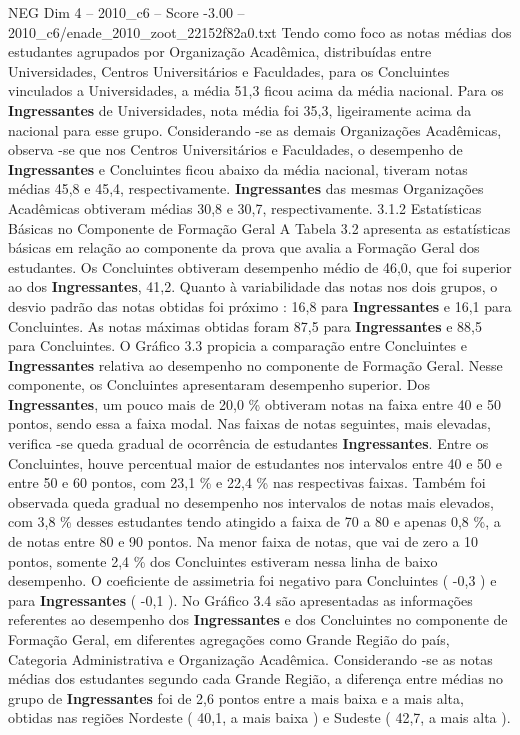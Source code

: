 \begin{textsample}{NEG Dim 4 – 2010\_c6 – Score -3.00 – 2010\_c6/enade\_2010\_zoot\_22152f82a0.txt}
Tendo como foco as notas médias dos estudantes agrupados por Organização Acadêmica, distribuídas entre Universidades, Centros Universitários e Faculdades, para os Concluintes vinculados a Universidades, a média 51,3 ficou acima da média nacional.
Para os \textbf{Ingressantes} de Universidades, nota média foi 35,3, ligeiramente acima da nacional para esse grupo.
Considerando -se as demais Organizações Acadêmicas, observa -se que nos Centros Universitários e Faculdades, o desempenho de \textbf{Ingressantes} e Concluintes ficou abaixo da média nacional, tiveram notas médias 45,8 e 45,4, respectivamente. \textbf{Ingressantes} das mesmas Organizações Acadêmicas obtiveram médias 30,8 e 30,7, respectivamente. 3.1.2 Estatísticas Básicas no Componente de Formação Geral A Tabela 3.2 apresenta as estatísticas básicas em relação ao componente da prova que avalia a Formação Geral dos estudantes.
Os Concluintes obtiveram desempenho médio de 46,0, que foi superior ao dos \textbf{Ingressantes}, 41,2.
Quanto à variabilidade das notas nos dois grupos, o desvio padrão das notas obtidas foi próximo : 16,8 para \textbf{Ingressantes} e 16,1 para Concluintes.
As notas máximas obtidas foram 87,5 para \textbf{Ingressantes} e 88,5 para Concluintes.
O Gráfico 3.3 propicia a comparação entre Concluintes e \textbf{Ingressantes} relativa ao desempenho no componente de Formação Geral.
Nesse componente, os Concluintes apresentaram desempenho superior.
Dos \textbf{Ingressantes}, um pouco mais de 20,0 \% obtiveram notas na faixa entre 40 e 50 pontos, sendo essa a faixa modal.
Nas faixas de notas seguintes, mais elevadas, verifica -se queda gradual de ocorrência de estudantes \textbf{Ingressantes}.
Entre os Concluintes, houve percentual maior de estudantes nos intervalos entre 40 e 50 e entre 50 e 60 pontos, com 23,1 \% e 22,4 \% nas respectivas faixas.
Também foi observada queda gradual no desempenho nos intervalos de notas mais elevados, com 3,8 \% desses estudantes tendo atingido a faixa de 70 a 80 e apenas 0,8 \%, a de notas entre 80 e 90 pontos.
Na menor faixa de notas, que vai de zero a 10 pontos, somente 2,4 \% dos Concluintes estiveram nessa linha de baixo desempenho.
O coeficiente de assimetria foi negativo para Concluintes ( -0,3 ) e para \textbf{Ingressantes} ( -0,1 ).
No Gráfico 3.4 são apresentadas as informações referentes ao desempenho dos \textbf{Ingressantes} e dos Concluintes no componente de Formação Geral, em diferentes agregações como Grande Região do país, Categoria Administrativa e Organização Acadêmica.
Considerando -se as notas médias dos estudantes segundo cada Grande Região, a diferença entre médias no grupo de \textbf{Ingressantes} foi de 2,6 pontos entre a mais baixa e a mais alta, obtidas nas regiões Nordeste ( 40,1, a mais baixa ) e Sudeste ( 42,7, a mais alta ).

\end{textsample}
